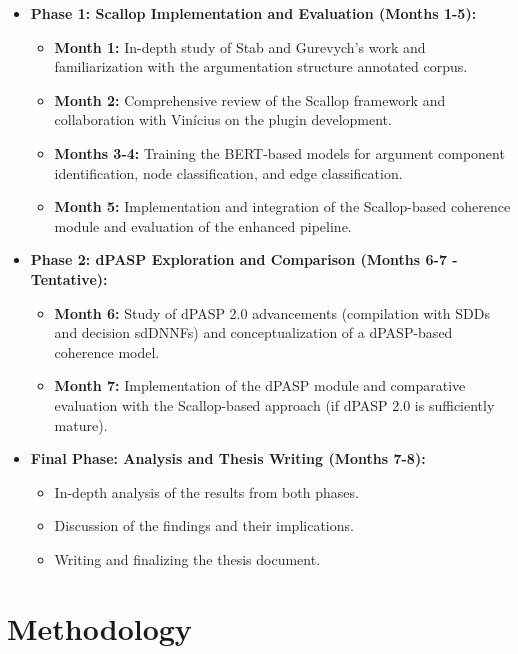 \documentclass{article}
\begin{document}
\begin{itemize}
    \item \textbf{Phase 1: Scallop Implementation and Evaluation (Months 1-5):}
    \begin{itemize}
        \item \textbf{Month 1:} In-depth study of Stab and Gurevych's work and
        familiarization with the argumentation structure annotated corpus.
        \item \textbf{Month 2:} Comprehensive review of the Scallop framework
        and collaboration with Vinícius on the plugin development.
        \item \textbf{Months 3-4:} Training the BERT-based models for argument
        component identification, node classification, and edge classification.
        \item \textbf{Month 5:} Implementation and integration of the
        Scallop-based coherence module and evaluation of the enhanced pipeline.
    \end{itemize}

    \item \textbf{Phase 2: dPASP Exploration and Comparison (Months 6-7 -
    Tentative):}
    \begin{itemize}
        \item \textbf{Month 6:} Study of dPASP 2.0 advancements (compilation
        with SDDs and decision sdDNNFs) and conceptualization of a
        dPASP-based coherence model.
        \item \textbf{Month 7:} Implementation of the dPASP module and
        comparative evaluation with the Scallop-based approach (if dPASP 2.0
        is sufficiently mature).
    \end{itemize}

    \item \textbf{Final Phase: Analysis and Thesis Writing (Months 7-8):}
    \begin{itemize}
        \item In-depth analysis of the results from both phases.
        \item Discussion of the findings and their implications.
        \item Writing and finalizing the thesis document.
    \end{itemize}
\end{itemize}

\section{Methodology}
\end{document}
